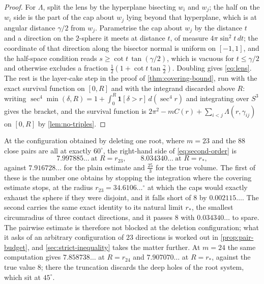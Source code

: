 \documentclass[11pt,reqno]{amsart}
\renewcommand{\_}{\origunderscore\allowbreak}
\numberwithin{equation}{section}
\theoremstyle{plain}
\theoremstyle{definition}
\theoremstyle{remark}
\begin{document}
\begin{proof}
For $\Lambda$, split the lens by the hyperplane bisecting $w_i$ and
$w_j$; the half on the $w_i$ side is the part of the cap about $w_j$
lying beyond that hyperplane, which is at angular distance $\gamma/2$
from $w_j$. Parametrise the cap about $w_j$ by the distance $t$ and a
direction on the $2$-sphere it meets at distance $t$, of measure
$4\pi\sin^2t\,dt$; the coordinate of that direction along the bisector
normal is uniform on $[-1,1]$, and the half-space condition reads
$s\ge\cot t\,\tan(\gamma/2)$, which is vacuous for $t\le\gamma/2$ and
otherwise excludes a fraction $\tfrac12(1+\cot t\tan\tfrac\gamma2)$.
Doubling gives \eqref{eq:lens}. The rest is the layer-cake step in the
proof of \cref{thm:covering-bound}, run with the exact survival function
on $[0,R]$ and with the integrand discarded above $R$: writing
$\sec^4\min(\delta,R)=1+\int_0^R\mathbf 1[\delta>r]\,d(\sec^4r)$ and
integrating over $S^3$ gives the bracket, and the survival function is
$2\pi^2-mC(r)+\sum_{i<j}\Lambda(r,\gamma_{ij})$ on $[0,R]$ by
\cref{lem:no-triples}.
\end{proof}

At the configuration obtained by deleting one root, where $m=23$ and the
$88$ close pairs are all at exactly $60^\circ$, the right-hand side of
\eqref{eq:second-order} is
\begin{equation}\label{eq:second-order-value}
  7.997885\ldots\ \text{at } R=r_{23},
  \qquad
  8.034340\ldots\ \text{at } R=r_* ,
\end{equation}
against $7.916728\ldots$ for the plain estimate and $\tfrac{25}3$ for
the true volume. The first of these is the number one obtains by
stopping the integration where the covering estimate stops, at the
radius $r_{23}=34.6106\ldots^\circ$ at which the caps would exactly
exhaust the sphere if they were disjoint, and it falls short of $8$ by
$0.002115\ldots$. The second carries the same exact identity to its
natural limit $r_*$, the smallest circumradius of three contact
directions, and it passes $8$ with $0.034340\ldots$ to spare. The
pairwise estimate is therefore not blocked at the deletion
configuration; what it asks of an arbitrary configuration of $23$
directions is worked out in \cref{prop:pair-budget}, and
\cref{sec:strict-inequality} takes the matter further. At $m=24$ the
same computation gives $7.858738\ldots$ at $R=r_{24}$ and
$7.907070\ldots$ at $R=r_*$, against the true value $8$; there the
truncation discards the deep holes of the root system, which sit at
$45^\circ$.
\end{document}
